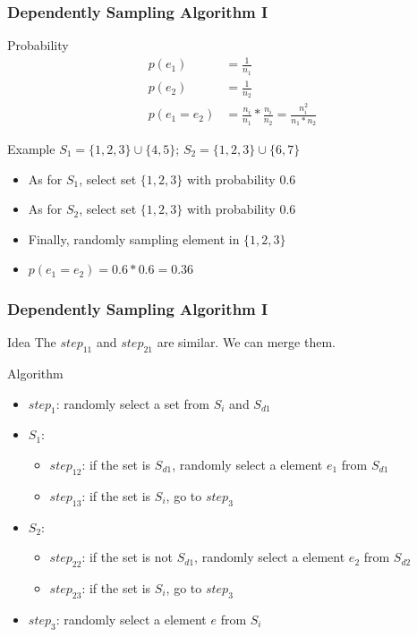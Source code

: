 \documentclass[notheorems, aspectratio=54]{beamer}
\begin{document}
\begin{frame}
    \frametitle{Dependently Sampling Algorithm I}
    \begin{block}{Probability}
        \begin{equation}
            \begin{aligned}
                p(e_1) &= \frac{1}{n_1}\\
                p(e_2) &= \frac{1}{n_2}\\
                p(e_1 = e_2) &=  \frac{n_i}{n_1}*\frac{n_i}{n_2} = \frac{n_i^2}{n_1*n_2}
            \end{aligned}
        \end{equation}
    \end{block}
    \begin{block}{Example}
        $S_1 =  \{1,2,3\} \cup \{4,5\}$; $S_2 = \{1,2,3\} \cup \{6,7\}$
        \begin{itemize}
            \item As for $S_1$, select set $\{1,2,3\}$ with probability $0.6$
            \item As for $S_2$, select set $\{1,2,3\}$ with probability $0.6$
            \item Finally, randomly sampling element in $\{1,2,3\}$
            \item $p(e_1 = e_2) = 0.6*0.6 = 0.36$
        \end{itemize}
    \end{block}
\end{frame}

\begin{frame}
    \frametitle{Dependently Sampling Algorithm I}
    \begin{block}{Idea}
        The $step_{11}$ and $step_{21}$ are similar. We can merge them.
    \end{block}
    \begin{block}{Algorithm}
        \begin{itemize}
            \item $step_{1}$: randomly select a set from $S_i$ and $S_{d1}$
            \item $S_1$:
            \begin{itemize}
                \item $step_{12}$: if the set is $S_{d1}$, randomly select a element $e_1$ from $S_{d1}$
                \item $step_{13}$: if the set is $S_i$, go to $step_{3}$
            \end{itemize}
            \item $S_2$:
            \begin{itemize}
                \item $step_{22}$: if the set is not $S_{d1}$, randomly select a element $e_2$ from $S_{d2}$
                \item $step_{23}$: if the set is $S_i$, go to $step_{3}$
            \end{itemize}
            \item $step_{3}$: randomly select a element $e$ from $S_i$
        \end{itemize}
    \end{block}
\end{frame}
\end{document}
